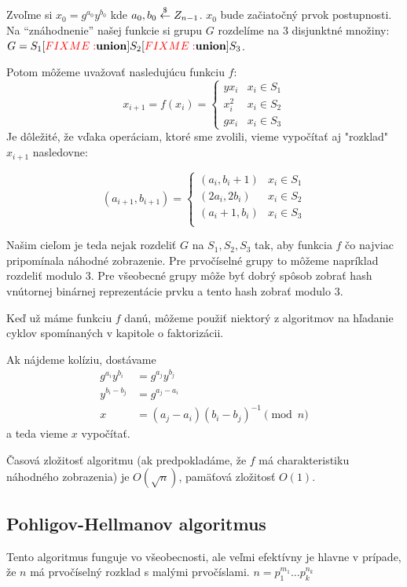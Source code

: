 Zvoľme si $x_0 = g^{a_0} y^{b_0}$ kde $a_0,b_0 \overset{\$}{\leftarrow} Z_{n-1}$.
$x_0$ bude začiatočný prvok postupnosti. Na ``znáhodnenie'' našej funkcie
si grupu $G$ rozdelíme na 3 disjunktné množiny:
\def\union{\fixme{union}}
$G=S_1 \union S_2 \union  S_3$.

Potom môžeme uvažovať nasledujúcu funkciu $f$:
\begin{equation*}
    x_{i+1} = f(x_i) =
        \begin{cases}
         y x_i & x_i \in S_1 \\
         x_i^2 & x_i \in S_2 \\
         g x_i & x_i \in S_3
        \end{cases}
\end{equation*}
Je dôležité, že vďaka operáciam, ktoré sme zvolili, vieme vypočítať aj
"rozklad" $x_{i+1}$ nasledovne:

\begin{equation*}
    (a_{i+1},b_{i+1}) =
        \begin{cases}
         (a_i,b_i+1) & x_i \in S_1 \\
         (2a_i,2b_i) & x_i \in S_2 \\
         (a_i+1,b_i) & x_i \in S_3 \\
        \end{cases}
\end{equation*}

Našim cieľom je teda nejak rozdeliť $G$ na $S_1,S_2,S_3$ tak, aby
funkcia $f$ čo najviac pripomínala náhodné zobrazenie.
Pre prvočíselné grupy to môžeme napríklad rozdeliť modulo 3.
Pre všeobecné grupy môže byť dobrý spôsob zobrať hash vnútornej binárnej
reprezentácie prvku a tento hash zobrať modulo 3.

Keď už máme funkciu $f$ danú, môžeme použiť niektorý z algoritmov na
hľadanie cyklov spomínaných v kapitole o faktorizácii.

Ak nájdeme kolíziu, dostávame
\begin{align*}
    g^{a_i} y^{b_i} &= g^{a_j} y^{b_j} \\
    y^{b_i-b_j} &= g^{a_j-a_i} \\
    x &=(a_j - a_i)(b_i-b_j)^{-1} \pmod n
\end{align*}
a teda vieme $x$ vypočítať.

Časová zložitosť algoritmu (ak predpokladáme,
že $f$ má charakteristiku náhodného zobrazenia) je
$O(\sqrt{n})$, pamäťová zložitosť $O(1)$.

\subsection{Pohligov-Hellmanov algoritmus}
Tento algoritmus funguje vo všeobecnosti, ale veľmi efektívny je hlavne v
prípade, že $n$ má prvočíselný rozklad s malými prvočíslami.
$n=p_1^{m_1} \dots p_k^{n_k}$



